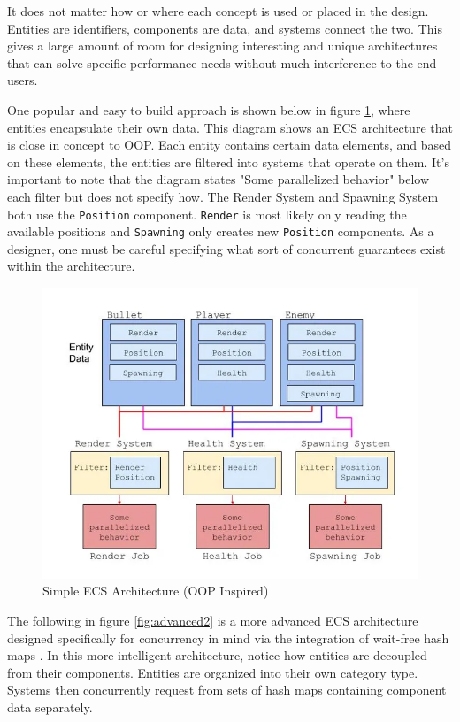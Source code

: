 It does not matter how or where each concept is used or placed in the design. Entities are identifiers, components are data, and systems connect the two. This gives a large amount of room for designing interesting and unique architectures that can solve specific performance needs without much interference to the end users. 

One popular and easy to build approach is shown below in figure \ref{fig:naive1}, where entities encapsulate their own data. This diagram shows an ECS architecture that is close in concept to OOP. Each entity contains certain data elements, and based on these elements, the entities are filtered into systems that operate on them. It's important to note that the diagram states "Some parallelized behavior" below each filter but does not specify how. The Render System and Spawning System both use the \texttt{Position} component. \texttt{Render} is most likely only reading the available positions and \texttt{Spawning} only creates new \texttt{Position} components. As a designer, one must be careful specifying what sort of concurrent guarantees exist within the architecture. 

\begin{figure}[H]
    \centering
    \includegraphics[width=0.7\linewidth]{resources/naive_ecs2.png}
    \caption{Simple ECS Architecture (OOP Inspired)}
    \label{fig:naive1}
\end{figure}


The following in figure \ref{fig:advanced2} is a more advanced ECS architecture designed specifically for concurrency in mind via the integration of wait-free hash maps \cite{waitfreemapsecs}. In this more intelligent architecture, notice how entities are decoupled from their components. Entities are organized into their own category type. Systems then concurrently request from sets of hash maps containing component data separately.

